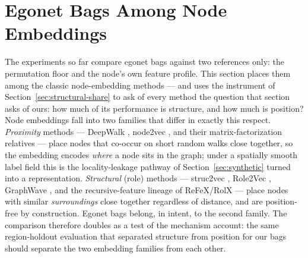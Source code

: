 \section{Egonet Bags Among Node Embeddings}
\label{sec:baselines}

The experiments so far compare egonet bags against two references only:
the permutation floor and the node's own feature profile. This section
places them among the classic node-embedding methods --- and uses the
instrument of Section~\ref{sec:structural-share} to ask of every method
the question that section asks of ours: how much of its performance is
structure, and how much is position? Node embeddings fall into two
families that differ in exactly this respect. \emph{Proximity} methods ---
DeepWalk \citep{perozzi2014deepwalk}, node2vec \citep{grover2016node2vec},
and their matrix-factorization relatives \citep{qiu2018netmf} --- place
nodes that co-occur on short random walks close together, so the
embedding encodes \emph{where} a node sits in the graph; under a
spatially smooth label field this is the locality-leakage pathway of
Section~\ref{sec:synthetic} turned into a representation. \emph{Structural}
(role) methods --- struc2vec \citep{ribeiro2017struc2vec}, Role2Vec
\citep{ahmed2018role2vec}, GraphWave \citep{donnat2018graphwave}, and the
recursive-feature lineage of ReFeX/RolX
\citep{henderson2011refex,henderson2012rolx,rossi2015roles} --- place nodes
with similar \emph{surroundings} close together regardless of distance,
and are position-free by construction. Egonet bags belong, in intent, to
the second family. The comparison therefore doubles as a test of the
mechanism account: the same region-holdout evaluation that separated
structure from position for our bags should separate the two embedding
families from each other.

